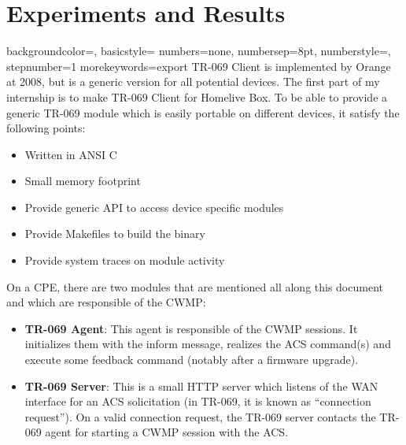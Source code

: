 
\chapter{Experiments and Results} %

\label{Chapter5} %


{
    backgroundcolor=\color{black},
    basicstyle=\scriptsize\color{white}\ttfamily
    numbers=none,
    numbersep=8pt,                   %
    numberstyle=\tiny\color{white}, %
    stepnumber=1                    %
}
{
  morekeywords={export}
}
TR-069 Client is implemented by Orange at 2008, but is a generic version for all potential devices. The first part of my internship is to make TR-069 Client for Homelive Box. To be able to provide a generic TR-069 module which is easily portable on different devices, it satisfy the following points:

\begin{itemize}
  \item Written in ANSI C
  \item Small memory footprint
  \item Provide generic API to access device specific modules
  \item Provide Makefiles to build the binary
  \item Provide system traces on module activity
\end{itemize}

On a CPE, there are two modules that are mentioned all along this document and which are responsible of
the CWMP:
\begin{itemize}
  \item \textbf{TR-069 Agent}: This agent is responsible of the CWMP sessions. It initializes them with the inform message, realizes the ACS command(s) and execute some feedback command (notably after a firmware upgrade).
  \item \textbf{TR-069 Server}: This is a small HTTP server which listens of the WAN interface for an ACS solicitation (in TR-069, it is known as “connection request”). On a valid connection request, the TR-069 server contacts the TR-069 agent for starting a CWMP session with the ACS.
\end{itemize}
